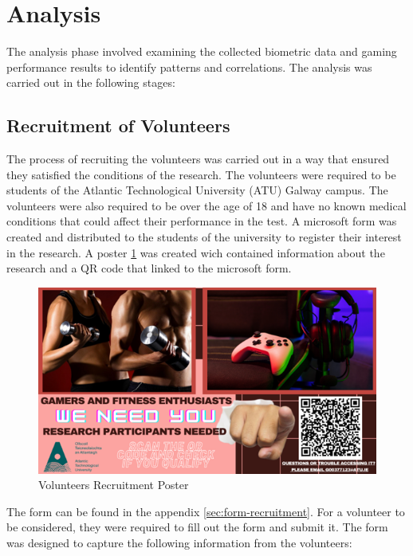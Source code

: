 \section{Analysis}
The analysis phase involved examining the collected biometric data and gaming performance results to identify patterns and correlations. The analysis was carried 
out in the following stages:

\subsection{Recruitment of Volunteers}
The process of recruiting the volunteers was carried out in a way that ensured they satisfied the conditions of the research. The volunteers were required to be students of the Atlantic 
Technological University (ATU) Galway campus. The volunteers were also required to be over the age of 18 and have no known medical conditions that could affect their performance in the
test. A microsoft form was created and distributed to the students of the university to register their interest in the research. A poster \ref{fig:recruitment-poster} was created
wich contained information about the research and a QR code that linked to the microsoft form.

\begin{figure}[ht]
    \centering
    \includegraphics[width=0.95\linewidth]{images/poster.png}
    \caption{Volunteers Recruitment Poster}
    \label{fig:recruitment-poster}
\end{figure}


The form can be found in the appendix \ref{sec:form-recruitment}.
For a volunteer to be considered, they were required to fill out the form and submit it. The form was designed to capture the following information from the volunteers:

